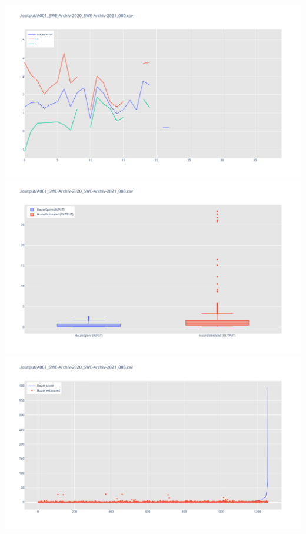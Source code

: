 \includegraphics[width=\textwidth]{Scripts/output/A001_SWE-Archiv-2020_SWE-Archiv-2021_080.csv.error_distribution.png}
\includegraphics[width=\textwidth]{Scripts/output/A001_SWE-Archiv-2020_SWE-Archiv-2021_080.csv.png}
\includegraphics[width=\textwidth]{Scripts/output/A001_SWE-Archiv-2020_SWE-Archiv-2021_080.csv.scatter.png}
